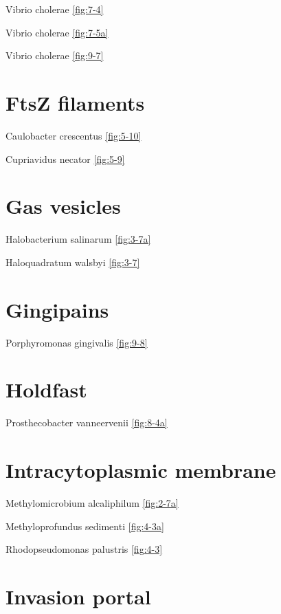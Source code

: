\documentclass[]{tufte-book}
\begin{document}
Vibrio cholerae \ref{fig:7-4}

Vibrio cholerae \ref{fig:7-5a}

Vibrio cholerae \ref{fig:9-7}

\hypertarget{ftsz-filaments}{%
\section*{FtsZ filaments}\label{ftsz-filaments}}

Caulobacter crescentus \ref{fig:5-10}

Cupriavidus necator \ref{fig:5-9}

\hypertarget{gas-vesicles}{%
\section*{Gas vesicles}\label{gas-vesicles}}

Halobacterium salinarum \ref{fig:3-7a}

Haloquadratum walsbyi \ref{fig:3-7}

\hypertarget{gingipains}{%
\section*{Gingipains}\label{gingipains}}

Porphyromonas gingivalis \ref{fig:9-8}

\hypertarget{holdfast}{%
\section*{Holdfast}\label{holdfast}}

Prosthecobacter vanneervenii \ref{fig:8-4a}

\hypertarget{intracytoplasmic-membrane-1}{%
\section*{Intracytoplasmic membrane}\label{intracytoplasmic-membrane-1}}

Methylomicrobium alcaliphilum \ref{fig:2-7a}

Methyloprofundus sedimenti \ref{fig:4-3a}

Rhodopseudomonas palustris \ref{fig:4-3}

\hypertarget{invasion-portal}{%
\section*{Invasion portal}\label{invasion-portal}}
\end{document}
